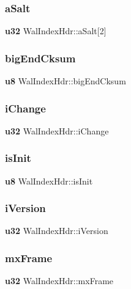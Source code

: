 \mbox{\label{struct_wal_index_hdr_af99b92f673fd7ba1e4e4f9feb955453f}} 
\subsubsection{aSalt}
{\footnotesize\ttfamily \textbf{ u32} Wal\+Index\+Hdr\+::a\+Salt[2]}

\mbox{\label{struct_wal_index_hdr_aa6be53a6a60ea0b2a97a245b5ca68d61}} 
\subsubsection{bigEndCksum}
{\footnotesize\ttfamily \textbf{ u8} Wal\+Index\+Hdr\+::big\+End\+Cksum}

\mbox{\label{struct_wal_index_hdr_a9fafc4d4af9ab741b3b8733380a7927f}} 
\subsubsection{iChange}
{\footnotesize\ttfamily \textbf{ u32} Wal\+Index\+Hdr\+::i\+Change}

\mbox{\label{struct_wal_index_hdr_a1cc0dc2be6cd108a7bcca260be3e4cb9}} 
\subsubsection{isInit}
{\footnotesize\ttfamily \textbf{ u8} Wal\+Index\+Hdr\+::is\+Init}

\mbox{\label{struct_wal_index_hdr_a49295f5eb9d6f37a1498cf1a66410b92}} 
\subsubsection{iVersion}
{\footnotesize\ttfamily \textbf{ u32} Wal\+Index\+Hdr\+::i\+Version}

\mbox{\label{struct_wal_index_hdr_aa697dbe8134daf3d02dce07feb897f41}} 
\subsubsection{mxFrame}
{\footnotesize\ttfamily \textbf{ u32} Wal\+Index\+Hdr\+::mx\+Frame}

